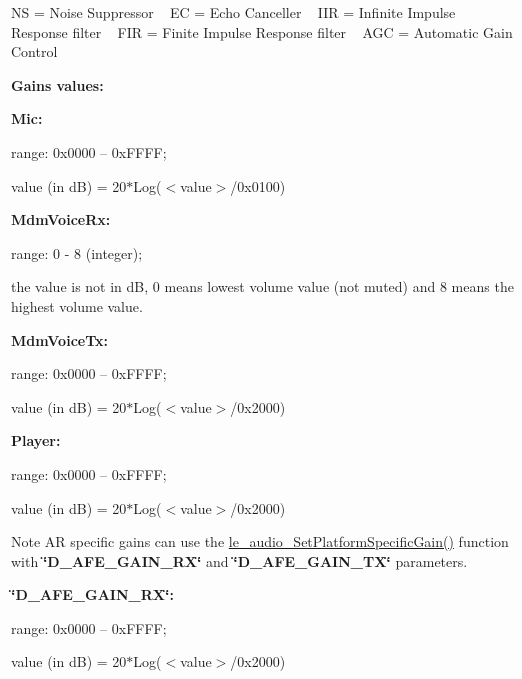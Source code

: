 NS = Noise Suppressor ~\newline
 EC = Echo Canceller ~\newline
 I\+IR = Infinite Impulse Response filter ~\newline
 F\+IR = Finite Impulse Response filter ~\newline
 A\+GC = Automatic Gain Control

{\bfseries Gains value\textquotesingle{}s\+:}

{\bfseries Mic\+:}
\begin{DoxyItemize}
\item range\+: 0x0000 – 0x\+F\+F\+FF;
\item value (in dB) = 20$\ast$\+Log($<$value$>$/0x0100)
\end{DoxyItemize}

{\bfseries Mdm\+Voice\+Rx\+:}
\begin{DoxyItemize}
\item range\+: 0 -\/ 8 (integer);
\item the value is not in dB, \textquotesingle{}0\textquotesingle{} means lowest volume value (not muted) and \textquotesingle{}8\textquotesingle{} means the highest volume value.
\end{DoxyItemize}

{\bfseries Mdm\+Voice\+Tx\+:}
\begin{DoxyItemize}
\item range\+: 0x0000 – 0x\+F\+F\+FF;
\item value (in dB) = 20$\ast$\+Log($<$value$>$/0x2000)
\end{DoxyItemize}

{\bfseries Player\+:}
\begin{DoxyItemize}
\item range\+: 0x0000 – 0x\+F\+F\+FF;
\item value (in dB) = 20$\ast$\+Log($<$value$>$/0x2000)
\end{DoxyItemize}

\begin{DoxyNote}{Note}
AR specific gains can use the \hyperlink{le__audio__interface_8h_a64e7ebe776e83d10deb42415e185d68a}{le\+\_\+audio\+\_\+\+Set\+Platform\+Specific\+Gain()} function with {\bfseries \char`\"{}\+D\+\_\+\+A\+F\+E\+\_\+\+G\+A\+I\+N\+\_\+\+R\+X\char`\"{}} and {\bfseries \char`\"{}\+D\+\_\+\+A\+F\+E\+\_\+\+G\+A\+I\+N\+\_\+\+T\+X\char`\"{}} parameters.
\end{DoxyNote}
{\bfseries \char`\"{}\+D\+\_\+\+A\+F\+E\+\_\+\+G\+A\+I\+N\+\_\+\+R\+X\char`\"{}\+:}
\begin{DoxyItemize}
\item range\+: 0x0000 – 0x\+F\+F\+FF;
\item value (in dB) = 20$\ast$\+Log($<$value$>$/0x2000)
\end{DoxyItemize}

